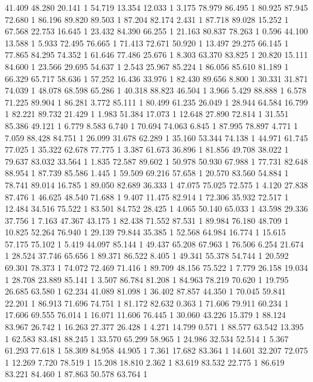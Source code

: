 	41.409	48.280	20.141	1
	54.719	13.354	12.033	1
	3.175	78.979	86.495	1
	80.925	87.945	72.680	1
	86.196	89.820	89.503	1
	87.204	82.174	2.431	1
	87.718	89.028	15.252	1
	67.568	22.753	16.645	1
	23.432	84.390	66.255	1
	21.163	80.837	78.263	1
	0.596	44.100	13.588	1
	5.933	72.495	76.665	1
	71.413	72.671	50.920	1
	13.497	29.275	66.145	1
	77.865	84.295	74.352	1
	61.646	77.486	25.676	1
	8.303	63.370	83.825	1
	20.820	15.111	84.600	1
	23.566	29.695	54.637	1
	2.543	25.967	85.224	1
	86.056	85.610	81.189	1
	66.329	65.717	58.636	1
	57.252	16.436	33.976	1
	82.430	89.656	8.800	1
	30.331	31.871	74.039	1
	48.078	68.598	65.286	1
	40.318	88.823	46.504	1
	3.966	5.429	88.888	1
	6.578	71.225	89.904	1
	86.281	3.772	85.111	1
	80.499	61.235	26.049	1
	28.944	64.584	16.799	1
	82.221	89.732	21.429	1
	1.983	51.384	17.073	1
	12.648	27.890	72.814	1
	31.551	85.386	49.121	1
	6.779	8.583	6.740	1
	70.694	74.063	6.845	1
	87.995	78.897	4.771	1
	7.059	88.428	84.751	1
	26.099	31.678	62.289	1
	35.160	53.344	74.138	1
	44.971	61.745	77.025	1
	35.322	62.678	77.775	1
	3.387	61.673	36.896	1
	81.856	49.708	38.022	1
	79.637	83.032	33.564	1
	1.835	72.587	89.602	1
	50.978	50.930	67.988	1
	77.731	82.648	88.954	1
	87.739	85.586	1.445	1
	59.509	69.216	57.658	1
	20.570	83.560	54.884	1
	78.741	89.014	16.785	1
	89.050	82.689	36.333	1
	47.075	75.025	72.575	1
	4.120	27.838	87.476	1
	46.625	48.540	71.688	1
	9.407	11.475	82.914	1
	72.306	35.932	72.517	1
	12.484	34.516	75.522	1
	83.501	84.752	28.425	1
	4.065	50.140	65.033	1
	43.598	29.336	37.756	1
	7.163	47.367	43.175	1
	82.438	71.552	87.531	1
	89.984	76.180	48.709	1
	10.825	52.264	76.940	1
	29.139	79.844	35.385	1
	52.568	64.984	16.774	1
	15.615	57.175	75.102	1
	5.419	44.097	85.144	1
	49.437	65.208	67.963	1
	76.506	6.254	21.674	1
	28.524	37.746	65.656	1
	89.371	86.522	8.405	1
	49.341	55.378	54.744	1
	20.592	69.301	78.373	1
	74.072	72.469	71.416	1
	89.709	48.156	75.522	1
	7.779	26.158	19.034	1
	28.708	23.889	85.141	1
	3.507	86.784	81.208	1
	84.963	78.219	70.620	1
	19.795	26.685	63.580	1
	62.234	41.089	81.098	1
	36.402	87.857	44.350	1
	70.045	59.841	22.201	1
	86.913	71.696	74.751	1
	81.172	82.632	0.363	1
	71.606	79.911	60.234	1
	17.606	69.555	76.014	1
	16.071	11.606	76.445	1
	30.060	43.226	15.379	1
	88.124	83.967	26.742	1
	16.263	27.377	26.428	1
	4.271	14.799	0.571	1
	88.577	63.542	13.395	1
	62.583	83.481	88.245	1
	33.570	65.299	58.965	1
	24.986	32.534	52.514	1
	5.367	61.293	77.618	1
	58.309	84.958	44.905	1
	7.361	17.682	83.364	1
	14.601	32.207	72.075	1
	12.269	7.720	78.519	1
	15.208	18.810	2.362	1
	83.619	83.532	22.775	1
	86.619	83.221	84.460	1
	87.863	50.578	63.764	1
